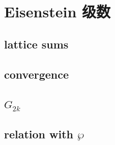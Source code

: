 \section{Eisenstein 级数}
\label{b3:sec:2302}


\subsection{lattice sums}
\label{b3:subsec:230201}

\subsection{convergence}
\label{b3:subsec:230202}

\subsection{\texorpdfstring{\(G_{2k}\)}{G2k}}
\label{b3:subsec:230203}

\subsection{relation with \texorpdfstring{\(\wp\)}{m}}
\label{b3:subsec:230204}


